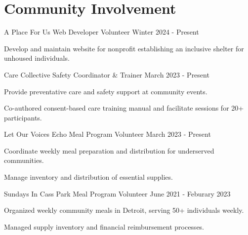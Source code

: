 \documentclass{../styles/cv}
\begin{document}
\section{Community Involvement}

\subsectionpositiondate
    {A Place For Us}
    {Web Developer Volunteer}
    {Winter 2024 - Present}
\resumesublistbegin
    \item Develop and maintain website for nonprofit establishing an inclusive shelter for unhoused individuals.
\resumesublistend

\subsectionpositiondate
    {Care Collective}
    {Safety Coordinator \& Trainer}
    {March 2023 - Present}
\resumesublistbegin
    \item Provide preventative care and safety support at community events.
    \item Co-authored consent-based care training manual and facilitate sessions for 20+ participants.
\resumesublistend

\subsectionpositiondate
    {Let Our Voices Echo}
    {Meal Program Volunteer}
    {March 2023 - Present}
\resumesublistbegin
    \item Coordinate weekly meal preparation and distribution for underserved communities.
    \item Manage inventory and distribution of essential supplies.
\resumesublistend

\subsectionpositiondate
    {Sundays In Cass Park}
    {Meal Program Volunteer}
    {June 2021 - Feburary 2023}
\resumesublistbegin
    \item Organized weekly community meals in Detroit, serving 50+ individuals weekly.
    \item Managed supply inventory and financial reimbursement processes.
\resumesublistend
\end{document}
